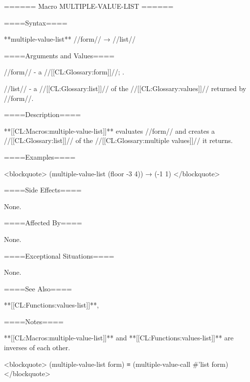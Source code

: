 ====== Macro MULTIPLE-VALUE-LIST ======

====Syntax====

**multiple-value-list** //form// → //list//

====Arguments and Values====

//form// - a //[[CL:Glossary:form]]//; \evalspecial.

//list// - a //[[CL:Glossary:list]]// of the //[[CL:Glossary:values]]// returned by //form//.

====Description====

**[[CL:Macros:multiple-value-list]]** evaluates //form// and creates a //[[CL:Glossary:list]]// of the //[[CL:Glossary:multiple values]]// it returns.

====Examples====

<blockquote> (multiple-value-list (floor -3 4)) → (-1 1) </blockquote>

====Side Effects====

None.

====Affected By====

None.

====Exceptional Situations====

None.

====See Also====

**[[CL:Functions:values-list]]**, 

====Notes====

**[[CL:Macros:multiple-value-list]]** and **[[CL:Functions:values-list]]** are inverses of each other.

<blockquote> (multiple-value-list form) ≡ (multiple-value-call #'list form) </blockquote>


